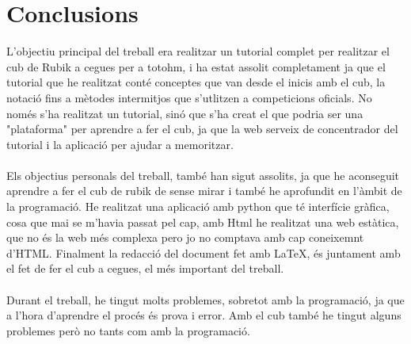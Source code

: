\pagestyle{conclusions}
\part*{Conclusions}

L'objectiu principal del treball era realitzar un tutorial complet per realitzar el cub de Rubik a cegues per a totohm, i ha estat assolit completament ja que el tutorial que he realitzat conté conceptes que van desde el inicis amb el cub, la notació fins a mètodes intermitjos que s'utlitzen a competicions oficials. 
No només s'ha realitzat un tutorial, sinó que s'ha creat el que podria ser una "plataforma" per aprendre a fer el cub, ja que la web serveix de concentrador del tutorial i la aplicació per ajudar a memoritzar.
\\\\Els objectius personals del treball, també han sigut assolits, ja que he aconseguit aprendre a fer el cub de rubik de sense mirar i també he aprofundit en l'àmbit de la programació. He realitzat una aplicació amb python que té interfície gràfica, cosa que mai se m'havia passat pel cap, amb Html he realitzat una web estàtica, que no és la web més complexa pero jo no comptava amb cap coneixemnt d'HTML. Finalment la redacció del document fet amb LaTeX, és juntament amb el fet de fer el cub a cegues, el més important del treball. 
\\\\Durant el treball, he tingut molts problemes, sobretot amb la programació, ja que a l'hora d'aprendre el procés és prova i error. Amb el cub també he tingut alguns problemes però no tants com amb la programació.
